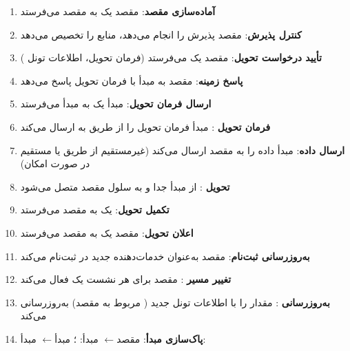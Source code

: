 \begin{enumerate}
  \begin{itemize}
  \tightlist
  \item
    زمینه  (، زمینه امنیتی، فهرست نشست )
  \item
    محفظه مبدأ-به-مقصد
  \item
    زمینه ، زمینه‌های 
  \end{itemize}
\item
  \textbf{آماده‌سازی  مقصد}:  مقصد یک  به  مقصد می‌فرستد
\item
  \textbf{کنترل پذیرش}:  مقصد پذیرش را انجام می‌دهد، منابع را تخصیص می‌دهد
\item
  \textbf{تأیید درخواست تحویل}:  مقصد یک  می‌فرستد (فرمان تحویل، اطلاعات تونل )
\item
  \textbf{پاسخ زمینه}:  مقصد به  مبدأ با فرمان تحویل پاسخ می‌دهد
\item
  \textbf{ارسال فرمان تحویل}:  مبدأ یک  به  مبدأ می‌فرستد
\item
  \textbf{فرمان تحویل }:  مبدأ فرمان تحویل را از طریق  به  ارسال می‌کند
\item
  \textbf{ارسال داده}:  مبدأ داده را به  مقصد ارسال می‌کند (غیرمستقیم از طریق  یا مستقیم در صورت امکان)
\item
  \textbf{تحویل }:  از مبدأ جدا و به سلول مقصد متصل می‌شود
\item
  \textbf{تکمیل تحویل}:  یک  به  مقصد می‌فرستد
\item
  \textbf{اعلان تحویل}:  مقصد یک  به  مقصد می‌فرستد
\item
  \textbf{به‌روزرسانی ثبت‌نام}:  مقصد به‌عنوان  خدمات‌دهنده جدید در  ثبت‌نام می‌کند
\item
  \textbf{تغییر مسیر }:  مقصد برای هر نشست  یک  فعال می‌کند
\item
  \textbf{به‌روزرسانی }:  مقدار  را با اطلاعات تونل  جدید ( مربوط به  مقصد) به‌روزرسانی می‌کند
\item
  \textbf{پاک‌سازی مبدأ}:  مقصد\ensuremath{\leftarrow} مبدأ: ؛  مبدأ\ensuremath{\leftarrow} مبدأ: 
\end{enumerate}

